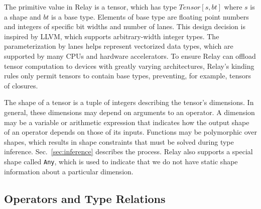       The primitive value in Relay is a tensor, which has
        type $Tensor[s, bt]$ where $s$ is a shape and $bt$ is a base type.
      Elements of base type are floating point numbers and
        integers of specific bit widths and number of lanes.
      This design decision is inspired by LLVM,
        which supports arbitrary-width integer types.
      The parameterization by lanes helps represent vectorized data types, which are supported
        by many CPUs and hardware accelerators.
      To ensure Relay can offload tensor computation to devices
        with greatly varying architectures,
        Relay's kinding rules only permit tensors to contain
        base types, preventing, for example, tensors of closures.

      The shape of a tensor is a tuple of integers describing the tensor's dimensions.
      In general, these dimensions may depend on arguments to an operator.
      A dimension may be a variable or arithmetic expression that indicates how the
        output shape of an operator depends on those of its inputs.
      Functions may be polymorphic over shapes, which results
        in shape constraints that must be solved during type inference.
      Sec.~\ref{sec:inference} describes the process.
      Relay also supports a special shape called \verb|Any|, which is used
        to indicate that we do not have static shape information about a particular dimension.

      \subsection{Operators and Type Relations}

